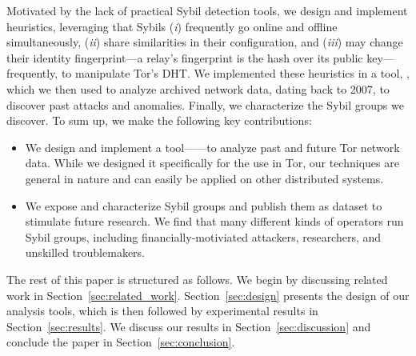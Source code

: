 Motivated by the lack of practical Sybil detection tools, we design and
implement heuristics, leveraging that Sybils (\emph{i}) frequently go online and
offline simultaneously, (\emph{ii}) share similarities in their configuration,
and (\emph{iii}) may change their identity fingerprint---a relay's fingerprint
is the hash over its public key---frequently, to manipulate Tor's DHT.  We
implemented these heuristics in a tool, \sys, which we then used to analyze
archived network data, dating back to 2007, to discover past attacks and
anomalies.  Finally, we characterize the Sybil groups we discover.  To sum up,
we make the following key contributions:
\begin{itemize}
	\item We design and implement a tool---\sys---to analyze past and future Tor
		network data.  While we designed it specifically for the use in Tor, our
		techniques are general in nature and can easily be applied on other
		distributed systems.
	\item We expose and characterize Sybil groups and publish them as dataset to
		stimulate future research.  We find that many different kinds of
		operators run Sybil groups, including financially-motiviated attackers,
		researchers, and unskilled troublemakers.
\end{itemize}

The rest of this paper is structured as follows.  We begin by discussing
related work in Section~\ref{sec:related_work}.  Section~\ref{sec:design}
presents the design of our analysis tools, which is then followed by
experimental results in Section~\ref{sec:results}.  We discuss our results in
Section~\ref{sec:discussion} and conclude the paper in
Section~\ref{sec:conclusion}.

